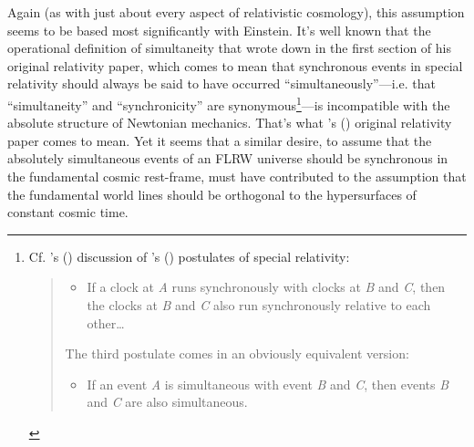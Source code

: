 \documentclass[12 pt]{article}
\def\citeapos#1{\citeauthor{#1}'s (\citeyear{#1})}
\begin{document}
Again (as with just about every aspect of relativistic cosmology), this assumption seems to be based most significantly with Einstein. It's well known that the operational definition of simultaneity that \citet{Einstein1905} wrote down in the first section of his original relativity paper, which comes to mean that synchronous events in special relativity should always be said to have occurred ``simultaneously''---i.e. that ``simultaneity'' and ``synchronicity'' are synonymous\footnote{Cf. \citeapos{Mermin2009} discussion of \citeapos{Einstein1905} postulates of special relativity:
\begin{quote}
\begin{itemize}
\item[$3.$] If a clock at \textit{A} runs synchronously with clocks at \textit{B} and \textit{C}, then the clocks at \textit{B} and \textit{C} also run synchronously relative to each other\ldots
\end{itemize}
The third postulate comes in an obviously equivalent version:
\begin{itemize}
\item[$3'.$] If an event \textit{A} is simultaneous with event \textit{B} and \textit{C}, then events \textit{B} and \textit{C} are also simultaneous.
\end{itemize}
\end{quote}}---is incompatible with the absolute structure of Newtonian mechanics. That's what \citeapos{Einstein1905} original relativity paper comes to mean. Yet it seems that a similar desire, to assume that the absolutely simultaneous events of an FLRW universe should be synchronous in the fundamental cosmic rest-frame, must have contributed to the assumption that the fundamental world lines should be orthogonal to the hypersurfaces of constant cosmic time.
\end{document}
